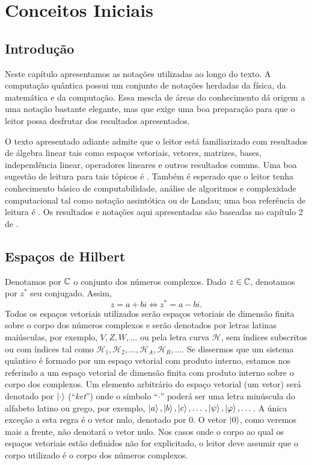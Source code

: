 
\chapter[Conceitos Iniciais]{Conceitos Iniciais}
\label{chap:notacoes}

\section{Introdução}

Neste capítulo apresentamos as notações utilizadas ao longo do texto. A computação quântica possui um conjunto de notações herdadas da física, da matemática e da computação. Essa mescla de áreas do conhecimento dá origem a uma notação bastante elegante, mas que exige uma boa preparação para que o leitor possa desfrutar dos resultados apresentados.

O texto apresentado adiante admite que o leitor está familiarizado com resultados de álgebra linear tais como espaços vetoriais, vetores, matrizes, bases, independência linear, operadores lineares e outros resultados comuns. Uma boa sugestão de leitura para tais tópicos é \cite{coelho2001curso}. Também é esperado que o leitor tenha conhecimento básico de computabilidade, análise de algoritmos e complexidade computacional tal como notação assintótica ou de Landau; uma boa referência de leitura é \cite{arora2009computational}. Os resultados e notações aqui apresentadas são baseadas no capítulo 2 de \cite{nielsen2010quantum}.

\section{Espaços de Hilbert}

Denotamos por $\mathbb{C}$ o conjunto dos números complexos. Dado $z \in \mathbb{C}$, denotamos por $z^*$ seu conjugado. Assim,
%
\begin{equation*}
	z = a+bi \iff z^* = a-bi.
\end{equation*}
%
Todos os espaços vetoriais utilizados serão espaços vetoriais de dimensão finita sobre o corpo dos números complexos e serão denotados por letras latinas maiúsculas, por exemplo, $V,Z,W, \dotso$ ou pela letra curva $\mathcal{H}$, sem índices subscritos ou com índices tal como $\mathcal{H}_1, \mathcal{H}_2, \dotso, \mathcal{H}_A, \mathcal{H}_B, \dotso$. Se dissermos que um sistema quântico é formado por um espaço vetorial com produto interno, estamos nos referindo a um espaço vetorial de dimensão finita com produto interno sobre o corpo dos complexos. Um elemento arbitrário do espaço vetorial (um vetor) será denotado por $\ket{\cdot}$ (``\textit{ket}'') onde o símbolo ``$\cdot$'' poderá ser uma letra minúscula do alfabeto latino ou grego, por exemplo, $\ket{a}, \ket{b}, \ket{c}, \dotso, \ket{\psi}, \ket{\varphi}, \dotso$. A única exceção a esta regra é o vetor nulo, denotado por $0$. O vetor $\ket{0}$, como veremos mais a frente, não denotará o vetor nulo. Nos casos onde o corpo ao qual os espaços vetoriais estão definidos não for explicitado, o leitor deve assumir que o corpo utilizado é o corpo dos números complexos.

